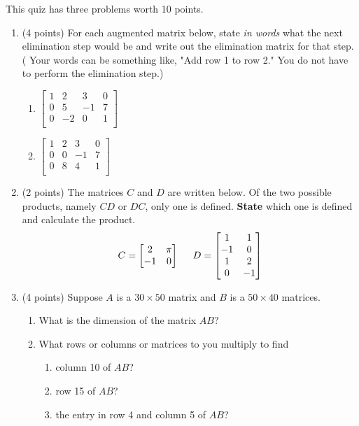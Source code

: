 \documentclass[11pt,fleqn]{article}
\def\bbm{\begin{bmatrix}}
\def\ebm{\end{bmatrix}}
\begin{document}
\renewcommand{\headrulewidth}{0pt}
\newcommand{\blank}[1]{\rule{#1}{0.75pt}}
\renewcommand{\d}{\displaystyle}

This quiz has three problems worth 10 points.
\begin{enumerate}
\item (4 points) For each augmented matrix below, state \textit{in words} what the next elimination step would be and write out the elimination matrix for that step. ( Your words can be something like, "Add row 1 to row 2." You do not have to perform the elimination step.)
	\begin{enumerate}
	\item $\bbm 1 &2& 3& 0\\ 0 &5 &-1& 7 \\ 0& -2& 0 &1\\ \ebm$
	\vfill
	\item $\bbm 1& 2 &3 &0\\ 0& 0 &-1& 7 \\ 0& 8& 4& 1\\ \ebm$
	\vfill
	\end{enumerate}
\item (2 points) The matrices $C$ and $D$ are written below. Of the two possible products, namely $CD$ or $DC$, only one is defined. \textbf{State} which one is defined and calculate the product.
 $$ C=\bbm 2 & \pi \\ -1 & 0 \ebm \hspace{.2in}D= \bbm 1&1\\-1&0\\1&2\\0&-1 \ebm$$
 \vfill
 
 \vfill
\newpage
\thispagestyle{plain}

\item (4 points) Suppose $A$ is a $30 \times 50$ matrix and $B$ is a $50 \times 40$ matrices. 
	\begin{enumerate}
	\item What is the dimension of the matrix $AB$?
	\vfill
	\item What rows or columns or matrices to you multiply to find
		\begin{enumerate}
		\item  column 10 of $AB$?
		\vfill
		\item  row 15 of $AB$?
		\vfill
		\item the entry in row 4 and column 5 of $AB$?
		\vfill
		\end{enumerate}
	\end{enumerate}


\end{enumerate}
\end{document}

